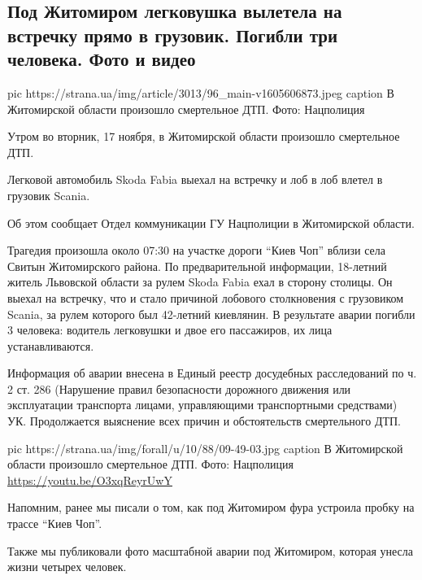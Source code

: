  
 

 

\subsection{Под Житомиром легковушка вылетела на встречку прямо в грузовик. Погибли три человека. Фото и видео}

\ifcmt
pic https://strana.ua/img/article/3013/96_main-v1605606873.jpeg
caption В Житомирской области произошло смертельное ДТП. Фото: Нацполиция 
\fi

Утром во вторник, 17 ноября, в Житомирской области произошло смертельное ДТП.

Легковой автомобиль Skoda Fabia выехал на встречку и лоб в лоб влетел в
грузовик Scania.

Об этом сообщает Отдел коммуникации ГУ Нацполиции в Житомирской области.  

Трагедия произошла около 07:30 на участке дороги \enquote{Киев \dshM Чоп} вблизи села
Свитын Житомирского района. По предварительной информации, 18-летний
житель Львовской области за рулем Skoda Fabia ехал в сторону столицы. Он
выехал на встречку, что и стало причиной лобового столкновения
с грузовиком Scania, за рулем которого был 42-летний киевлянин. В
результате аварии погибли 3 человека: водитель легковушки и двое его
пассажиров, их лица устанавливаются. 

Информация об аварии внесена в Единый реестр досудебных расследований по
ч. 2 ст. 286 (Нарушение правил безопасности дорожного движения или
эксплуатации транспорта лицами, управляющими транспортными средствами) УК.
Продолжается выяснение всех причин и обстоятельств смертельного ДТП.

\ifcmt
pic https://strana.ua/img/forall/u/10/88/09-49-03.jpg
caption В Житомирской области произошло смертельное ДТП. Фото: Нацполиция \url{https://youtu.be/O3xqReyrUwY}
\fi


Напомним, ранее мы писали о том, как под Житомиром фура устроила пробку на
трассе \enquote{Киев \dshM Чоп}.

Также мы публиковали фото масштабной аварии под Житомиром, которая унесла
жизни четырех человек.


